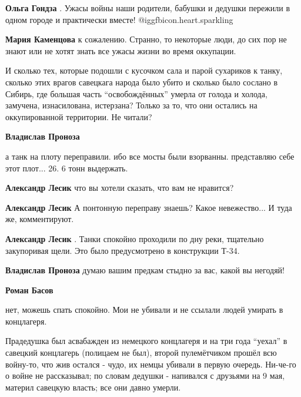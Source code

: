 \begin{itemize}
\begin{itemize} %
\textbf{Ольга Гондза} . Ужасы войны наши родители, бабушки и дедушки пережили в одном городе и практически вместе!  @igg{fbicon.heart.sparkling} 

\textbf{Мария Каменцова} к сожалению. Странно, то некоторые люди, до сих пор не знают или не хотят знать все ужасы жизни во время оккупации.
\end{itemize} %


И сколько тех, которые подошли с кусочком сала и парой сухариков к танку, сколько
этих врагов савецкага народа было убито и сколько было сослано в Сибирь, где
большая часть \enquote{освобождённых} умерла от голода и
холода, замучена, изнасилована, истерзана? Только за то, что они остались на
оккупированной территории. Не читали?

\begin{itemize} %
\textbf{Владислав Проноза} 

а танк на плоту переправили. ибо все мосты были
взорванны. представляю себе этот плот... 26. 6 тонн выдержать.

\begin{itemize} %
\textbf{Александр Лесик} что вы хотели сказать, что вам не нравится?

\textbf{Александр Лесик} А понтонную переправу знаешь? Какое невежество... И туда же, комментируют.

\textbf{Александр Лесик} . Танки спокойно проходили по дну реки, тщательно закупоривая щели. Это было предусмотрено в конструкции Т-34.
\end{itemize} %

\textbf{Владислав Проноза} думаю вашим предкам стыдно за вас, какой вы негодяй!

\begin{itemize} %
\textbf{Роман Басов} 

нет, можешь спать спокойно. Мои не убивали и не ссылали людей умирать в
концлагеря.

Прадедушка был асвабажден из немецкого концлагеря и на три года \enquote{уехал} в
савецкий концлагерь (полицаем не был), второй пулемётчиком прошёл всю войну-то,
что жив остался - чудо, их немцы убивали в первую очередь. Ни-че-го о войне не
рассказывал; по словам дедушки - напивался с друзьями на 9 мая, материл
савецкую власть; все они давно умерли.


\end{itemize}
\end{itemize}
\end{itemize}

